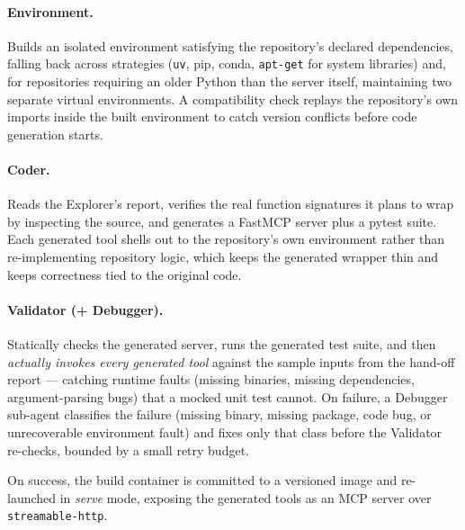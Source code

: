 \paragraph{Environment.} Builds an isolated environment satisfying the repository's declared dependencies, falling back across strategies (\texttt{uv}, pip, conda, \texttt{apt-get} for system libraries) and, for repositories requiring an older Python than the server itself, maintaining two separate virtual environments. A compatibility check replays the repository's own imports inside the built environment to catch version conflicts before code generation starts.

\paragraph{Coder.} Reads the Explorer's report, verifies the real function signatures it plans to wrap by inspecting the source, and generates a FastMCP server plus a pytest suite. Each generated tool shells out to the repository's own environment rather than re-implementing repository logic, which keeps the generated wrapper thin and keeps correctness tied to the original code.

\paragraph{Validator (+ Debugger).} Statically checks the generated server, runs the generated test suite, and then \emph{actually invokes every generated tool} against the sample inputs from the hand-off report — catching runtime faults (missing binaries, missing dependencies, argument-parsing bugs) that a mocked unit test cannot. On failure, a Debugger sub-agent classifies the failure (missing binary, missing package, code bug, or unrecoverable environment fault) and fixes only that class before the Validator re-checks, bounded by a small retry budget.

On success, the build container is committed to a versioned image and re-launched in \emph{serve} mode, exposing the generated tools as an MCP server over \texttt{streamable-http}.
